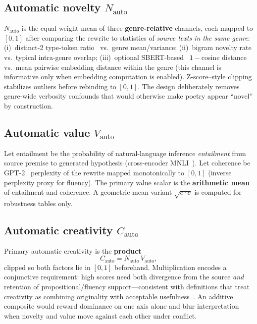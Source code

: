\documentclass[sigconf,nonacm]{acmart}
\begin{document}
\subsection{Automatic novelty $N_{\mathrm{auto}}$}

$N_{\mathrm{auto}}$ is the equal-weight mean of three \textbf{genre-relative} channels, each mapped to $[0,1]$ after comparing the rewrite to statistics of \emph{source texts in the same genre}: (i)~distinct-2 type-token ratio~\cite{guilford1967} vs.\ genre mean/variance; (ii)~bigram novelty rate vs.\ typical intra-genre overlap; (iii)~optional SBERT-based~\cite{reimers2019,xiao2023} $1{-}$cosine distance vs.\ mean pairwise embedding distance within the genre (this channel is informative only when embedding computation is enabled). Z-score--style clipping stabilizes outliers before rebinding to $[0,1]$. The design deliberately removes genre-wide verbosity confounds that would otherwise make poetry appear ``novel'' by construction.

\subsection{Automatic value $V_{\mathrm{auto}}$}

Let entailment be the probability of natural-language inference \emph{entailment} from source premise to generated hypothesis (cross-encoder MNLI~\cite{williams2018}). Let coherence be GPT-2~\cite{radford2019} perplexity of the rewrite mapped monotonically to $[0,1]$ (inverse perplexity proxy for fluency). The primary value scalar is the \textbf{arithmetic mean} of entailment and coherence. A geometric mean variant $\sqrt{e\cdot c}$ is computed for robustness tables only.

\subsection{Automatic creativity $C_{\mathrm{auto}}$}

Primary automatic creativity is the \textbf{product}
\[
  C_{\mathrm{auto}} = N_{\mathrm{auto}}\, V_{\mathrm{auto}},
\]
clipped so both factors lie in $[0,1]$ beforehand. Multiplication encodes a conjunctive requirement: high scores need both divergence from the source \emph{and} retention of propositional/fluency support---consistent with definitions that treat creativity as combining originality with acceptable usefulness~\cite{runco,amabile1983}. An additive composite would reward dominance on one axis alone and blur interpretation when novelty and value move against each other under conflict.
\end{document}
